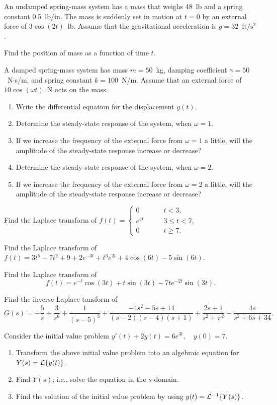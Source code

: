 \item
An undamped spring-mass system has
a mass that weighs 48~lb and a spring constant 0.5~lb/in.
The mass is suddenly set in motion at $t=0$ by an external force
of $3\cos(2t)$~lb.
Assume that the gravitational acceleration is
$g=32$~$\mbox{ft}/\mbox{s}^2$.

Find the position of mass as a function of time $t$.

\item
A damped spring-mass system has mass $m=50$~kg,
damping coefficient $\gamma=50$~N$\cdot$s/m,
and spring constant $k=100$~N/m.
Assume that an external force of $10\cos(\omega t)$~N acts on the mass.
	\begin{enumerate}
	\item
Write the differential equation for the displacement $y(t)$.
	\item
	Determine the steady-state response of the system, when $\omega=1$.
	\item
	If we increase the frequency of the external force from $\omega=1$ a little,
	will the amplitude of the steady-state response increase or decrease?
	\item
	Determine the steady-state response of the system, when $\omega=2$.
	\item
	If we increase the frequency of the external force from $\omega=2$ a little,
	will the amplitude of the steady-state response increase or decrease?
 	\end{enumerate}

\item
Find the Laplace transform of $f(t)=\left\{ \begin{array}{ll}
0 \qquad & t<3,\\
e^{4t} \qquad & 3\le t<7,\\
0\qquad & t\ge 7.
\end{array}\right.$

\item
Find the Laplace transform of 
$f(t)=3t^5-7t^2+9+2e^{-3t}+t^3 e^{2t} +4\cos(6t)-5\sin(6t)$.

\item
Find the Laplace transform of
$$
f(t)=e^{-t}\cos(3t) +t\sin(3t) -7te^{-2t}\sin(3t).
$$


\item
Find the inverse Laplace tansform of 
$$
G(s)= -\frac{5}{s} +\frac{3}{s^6}+\frac{1}{(s-5)^3}
+\frac{-4s^2-5s+14}{(s-2)(s-4)(s+1)}
+\frac{2s+1}{s^2+\pi^2}
-\frac{4s}{s^2 +6s +34}.
$$


\item
Consider the initial value problem
$y'(t)+2y(t)=6e^{3t}, \quad y(0)=7.$
	\begin{enumerate}
	\item
Transform the above initial value problem
 into an algebraic equation for $Y(s)={\cal L}\{y(t)\}$. 
	\item
Find $Y(s)$; i.e., solve the equation in the $s$-domain.
	\item
Find the solution of the initial value problem by using
$y(t)={\cal L}^{-1}\{Y(s)\}$.
	\end{enumerate}

